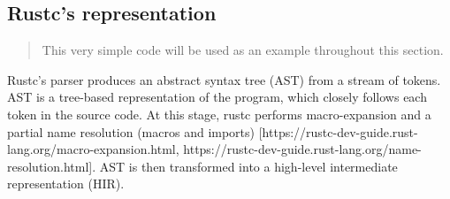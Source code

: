 \hypertarget{rustcs-representation}{%
\subsection{Rustc's representation}\label{rustcs-representation}}

\begin{Shaded}
\begin{Highlighting}[]
\NormalTok{)}\OperatorTok{;}

\OperatorTok{:} \NormalTok{) }\OperatorTok{{-}\textgreater{}}\OperatorTok{\{}
\OperatorTok{\}}
\end{Highlighting}
\end{Shaded}

\begin{quote}
This very simple code will be used as an example throughout this
section.
\end{quote}

Rustc's parser produces an abstract syntax tree (AST) from a stream of
tokens. AST is a tree-based representation of the program, which closely
follows each token in the source code. At this stage, rustc performs
macro-expansion and a partial name resolution (macros and imports)
{[}https://rustc-dev-guide.rust-lang.org/macro-expansion.html,
https://rustc-dev-guide.rust-lang.org/name-resolution.html{]}. AST is
then transformed into a high-level intermediate representation (HIR).

